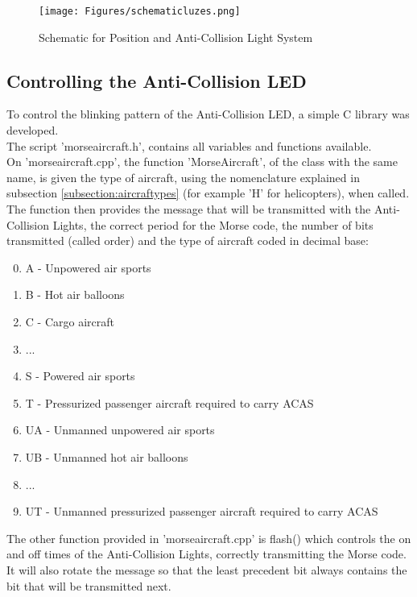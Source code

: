 \begin{figure}[!htb]
  \centering
  \texttt{[image: Figures/schematicluzes.png]}
  \caption[Schematic for Position and Anti-Collision Light System]{Schematic for Position and Anti-Collision Light System}
  \label{fig:schematicluzes}
\end{figure}

\subsection{Controlling the Anti-Collision LED}
\label{subsection:pcontrolblink}

To control the blinking pattern of the Anti-Collision LED, a simple C library was developed.\\
The script 'morseaircraft.h', contains all variables and functions available.\\
On 'morseaircraft.cpp', the function 'MorseAircraft', of the class with the same name, is given the type of aircraft, using the nomenclature explained in subsection \ref{subsection:aircraftypes} (for example 'H' for helicopters), when called. The function then provides the message that will be transmitted with the Anti-Collision Lights, the correct period for the Morse code, the number of bits transmitted (called order) and the type of aircraft coded in decimal base:
\begin{enumerate}
\setcounter{enumi}{-1}
\item A - Unpowered air sports
\item B - Hot air balloons
\item C - Cargo aircraft
\item[] ...
\setcounter{enumi}{11}
\item S - Powered air sports
\item T - Pressurized passenger aircraft required to carry ACAS
\item UA - Unmanned unpowered air sports
\item UB - Unmanned hot air balloons
\item[] ...
\setcounter{enumi}{26}
\item UT - Unmanned pressurized passenger aircraft required to carry ACAS
\end{enumerate}

The other function provided in 'morseaircraft.cpp' is flash() which controls the on and off times of the Anti-Collision Lights, correctly transmitting the Morse code. It will also rotate the message so that the least precedent bit always contains the bit that will be transmitted next.

